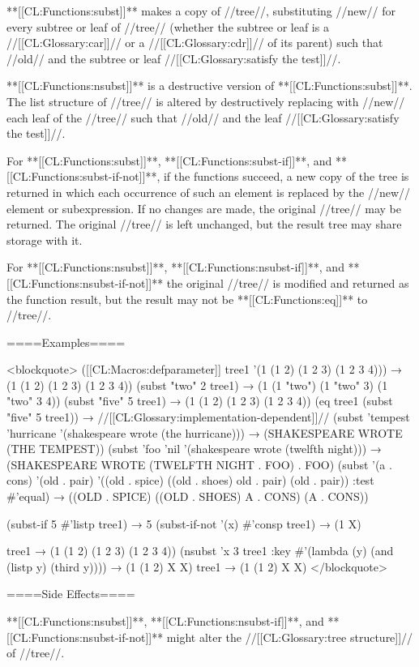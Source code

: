**[[CL:Functions:subst]]** makes a copy of //tree//, substituting //new// for every subtree or leaf of //tree// (whether the subtree or leaf is a //[[CL:Glossary:car]]// or a //[[CL:Glossary:cdr]]// of its parent) such that //old// and the subtree or leaf //[[CL:Glossary:satisfy the test]]//.

**[[CL:Functions:nsubst]]** is a destructive version of **[[CL:Functions:subst]]**. The list structure of //tree// is altered by destructively replacing with //new// each leaf of the //tree// such that //old// and the leaf //[[CL:Glossary:satisfy the test]]//.

For **[[CL:Functions:subst]]**, **[[CL:Functions:subst-if]]**, and **[[CL:Functions:subst-if-not]]**, if the functions succeed, a new copy of the tree is returned in which each occurrence of such an element is replaced by the //new// element or subexpression. If no changes are made, the original //tree// may be returned. The original //tree// is left unchanged, but the result tree may share storage with it.

For **[[CL:Functions:nsubst]]**, **[[CL:Functions:nsubst-if]]**, and **[[CL:Functions:nsubst-if-not]]** the original //tree// is modified and returned as the function result, but the result may not be **[[CL:Functions:eq]]** to //tree//.

====Examples====

<blockquote> ([[CL:Macros:defparameter]] tree1 '(1 (1 2) (1 2 3) (1 2 3 4))) → (1 (1 2) (1 2 3) (1 2 3 4)) (subst "two" 2 tree1) → (1 (1 "two") (1 "two" 3) (1 "two" 3 4)) (subst "five" 5 tree1) → (1 (1 2) (1 2 3) (1 2 3 4)) (eq tree1 (subst "five" 5 tree1)) → //[[CL:Glossary:implementation-dependent]]// (subst 'tempest 'hurricane '(shakespeare wrote (the hurricane))) → (SHAKESPEARE WROTE (THE TEMPEST)) (subst 'foo 'nil '(shakespeare wrote (twelfth night))) → (SHAKESPEARE WROTE (TWELFTH NIGHT . FOO) . FOO) (subst '(a . cons) '(old . pair) '((old . spice) ((old . shoes) old . pair) (old . pair)) :test #'equal) → ((OLD . SPICE) ((OLD . SHOES) A . CONS) (A . CONS))

(subst-if 5 #'listp tree1) → 5 (subst-if-not '(x) #'consp tree1) → (1 X)

tree1 → (1 (1 2) (1 2 3) (1 2 3 4)) (nsubst 'x 3 tree1 :key #'(lambda (y) (and (listp y) (third y)))) → (1 (1 2) X X) tree1 → (1 (1 2) X X) </blockquote>

====Side Effects====

**[[CL:Functions:nsubst]]**, **[[CL:Functions:nsubst-if]]**, and **[[CL:Functions:nsubst-if-not]]** might alter the //[[CL:Glossary:tree structure]]// of //tree//.

